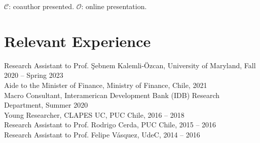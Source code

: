 \documentclass[10pt]{article}
\begin{document}
{\footnotesize $\mathcal{C}$: coauthor presented. $\mathcal{O}$: online presentation.}









%
%
%





\section*{Relevant Experience}


Research Assistant to Prof. \c{S}ebnem Kalemli-\"{O}zcan, University of Maryland, Fall 2020 -- Spring 2023\\
Aide to the Minister of Finance, Ministry of Finance, Chile, 2021 \\
Macro Consultant, Interamerican Development Bank (IDB) Research Department, Summer 2020\\
Young Researcher, CLAPES UC, PUC Chile, 2016 -- 2018\\
Research Assistant to Prof. Rodrigo Cerda, PUC Chile, 2015 -- 2016\\
Research Assistant to Prof. Felipe V\'asquez, UdeC, 2014 -- 2016
\end{document}
